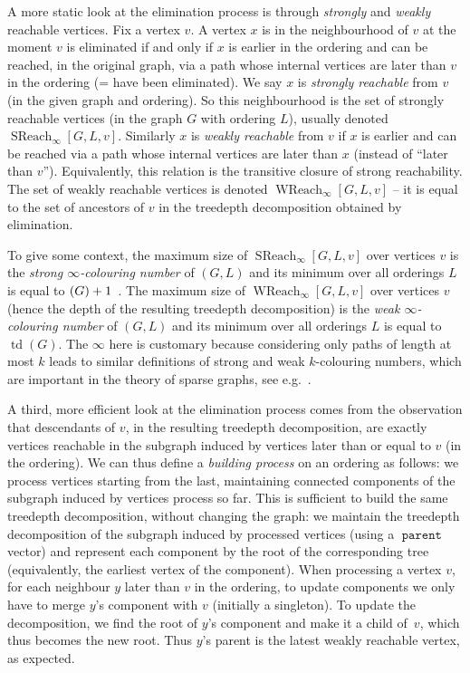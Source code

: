 \documentclass{timgad}
\DeclareMathOperator{\td}{td}
\let\tw\relax
\DeclareMathOperator{\tw}{tw}
\DeclareMathOperator{\SReach}{SReach}
\DeclareMathOperator{\WReach}{WReach}
\DeclareMathOperator{\parent}{\texttt{parent}}
\begin{document}
A more static look at the elimination process is through \emph{strongly} and \emph{weakly} reachable vertices.
Fix a vertex $v$.
A vertex $x$ is in the neighbourhood of $v$ at the moment $v$ is eliminated
if and only if $x$ is earlier in the ordering and can be reached, in the original graph, via a path whose internal vertices are later than $v$ in the ordering (= have been eliminated).
We say $x$ is \emph{strongly reachable} from $v$ (in the given graph and ordering).
So this neighbourhood is the set of strongly reachable vertices (in the graph $G$ with ordering $L$), usually denoted $\SReach_{\infty}[G,L,v]$.
Similarly $x$ is \emph{weakly reachable} from $v$ if $x$ is earlier and can be reached via a path whose internal vertices are later than $x$ (instead of ``later than $v$'').
Equivalently, this relation is the transitive closure of strong reachability.
The set of weakly reachable vertices is denoted $\WReach_{\infty}[G,L,v]$ -- it is equal to the set of ancestors of $v$ in the treedepth decomposition obtained by elimination.

To give some context,
the maximum size of $\SReach_{\infty}[G,L,v]$ over vertices $v$ is the \emph{strong $\infty$-colouring number} of $(G,L)$
and its minimum over all orderings $L$ is equal to $\tw(G) + 1$~\cite[Theorem 3.1]{Arnborg85}.
The maximum size of $\WReach_{\infty}[G,L,v]$ over vertices $v$ (hence the depth of the resulting treedepth decomposition) is the \emph{weak $\infty$-colouring number} of $(G,L)$
and its minimum over all orderings $L$ is equal to $\td(G)$.
The $\infty$ here is customary because considering only paths of length at most $k$ leads to similar definitions of strong and weak $k$-colouring numbers, which are important in the theory of sparse graphs, see e.g.~\cite{HeuvelMQRS17}.

A third, more efficient look at the elimination process comes from the observation that 
descendants of $v$, in the resulting treedepth decomposition, are exactly vertices reachable in the subgraph induced by vertices later than or equal to $v$ (in the ordering).
We can thus define a \emph{building process} on an ordering as follows:
we process vertices starting from the last, maintaining connected components of the subgraph induced by vertices process so far.
This is sufficient to build the same treedepth decomposition, without changing the graph:
we maintain the treedepth decomposition of the subgraph induced by processed vertices
(using a $\parent$ vector)
and represent each component by the root of the corresponding tree (equivalently, the earliest vertex of the component).
When processing a vertex $v$, 
for each neighbour $y$ later than $v$ in the ordering, to update components we only have to
merge $y$'s component with $v$ (initially a singleton).
To update the decomposition,
we find the root of $y$'s component and make it a child of~$v$,
which thus becomes the new root.
Thus $y$'s parent is the latest weakly reachable vertex, as expected.
\end{document}
